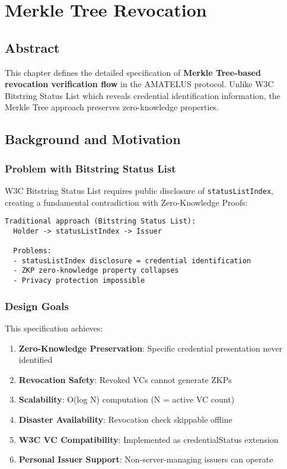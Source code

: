 \chapter{Merkle Tree Revocation}

\section{Abstract}

This chapter defines the detailed specification of \textbf{Merkle Tree-based revocation verification flow} in the AMATELUS protocol. Unlike W3C Bitstring Status List which reveals credential identification information, the Merkle Tree approach preserves zero-knowledge properties.

\section{Background and Motivation}

\subsection{Problem with Bitstring Status List}

W3C Bitstring Status List requires public disclosure of \texttt{statusListIndex}, creating a fundamental contradiction with Zero-Knowledge Proofs:

\begin{verbatim}
Traditional approach (Bitstring Status List):
  Holder -> statusListIndex -> Issuer

  Problems:
  - statusListIndex disclosure = credential identification
  - ZKP zero-knowledge property collapses
  - Privacy protection impossible
\end{verbatim}

\subsection{Design Goals}

This specification achieves:

\begin{enumerate}
  \item \textbf{Zero-Knowledge Preservation}: Specific credential presentation never identified
  \item \textbf{Revocation Safety}: Revoked VCs cannot generate ZKPs
  \item \textbf{Scalability}: O(log N) computation (N = active VC count)
  \item \textbf{Disaster Availability}: Revocation check skippable offline
  \item \textbf{W3C VC Compatibility}: Implemented as credentialStatus extension
  \item \textbf{Personal Issuer Support}: Non-server-managing issuers can operate
\end{enumerate}


